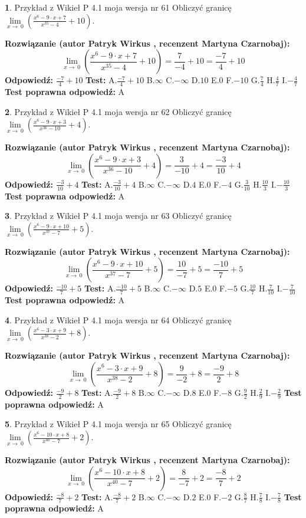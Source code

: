 \documentclass[12pt, a4paper]{article}
\theoremstyle{definition} %
\newtheorem{zad}{}
\newcommand{\zadStart}[1]{\begin{zad}#1\newline}
\newcommand{\zadStop}{\end{zad}}
\newcommand{\rozwStart}[2]{\noindent \textbf{Rozwiązanie (autor #1 , recenzent #2): }\newline}
\newcommand{\rozwStop}{\newline}
\newcommand{\odpStart}{\noindent \textbf{Odpowiedź:}\newline}
\newcommand{\odpStop}{\newline}
\newcommand{\testStart}{\noindent \textbf{Test:}\newline}
\newcommand{\testStop}{\newline}
\newcommand{\kluczStart}{\noindent \textbf{Test poprawna odpowiedź:}\newline}
\newcommand{\kluczStop}{\newline}
\begin{document}
\zadStart{Przykład z Wikieł P 4.1 moja wersja nr 61}
Obliczyć granicę $\lim\limits_{x\to\ 0}(\frac{x^{6}-9 \cdot x +7}{x^{35}-4}+10)$.
\zadStop
\rozwStart{Patryk Wirkus}{Martyna Czarnobaj}
$$\lim\limits_{x\to\ 0}(\frac{x^{6}-9 \cdot x +7}{x^{35}-4}+10)=\frac{7}{-4}+10=\frac{-7}{4}+10$$
\rozwStop
\odpStart
$\frac{-7}{4}+10$
\odpStop
\testStart
A.$\frac{-7}{4}+10$
B.$\infty$
C.$-\infty$
D.$10$
E.$0$
F.$-10$
G.$\frac{7}{4}$
H.$\frac{4}{7}$
I.$-\frac{4}{7}$
\testStop
\kluczStart
A
\kluczStop



\zadStart{Przykład z Wikieł P 4.1 moja wersja nr 62}
Obliczyć granicę $\lim\limits_{x\to\ 0}(\frac{x^{6}-9 \cdot x +3}{x^{36}-10}+4)$.
\zadStop
\rozwStart{Patryk Wirkus}{Martyna Czarnobaj}
$$\lim\limits_{x\to\ 0}(\frac{x^{6}-9 \cdot x +3}{x^{36}-10}+4)=\frac{3}{-10}+4=\frac{-3}{10}+4$$
\rozwStop
\odpStart
$\frac{-3}{10}+4$
\odpStop
\testStart
A.$\frac{-3}{10}+4$
B.$\infty$
C.$-\infty$
D.$4$
E.$0$
F.$-4$
G.$\frac{3}{10}$
H.$\frac{10}{3}$
I.$-\frac{10}{3}$
\testStop
\kluczStart
A
\kluczStop



\zadStart{Przykład z Wikieł P 4.1 moja wersja nr 63}
Obliczyć granicę $\lim\limits_{x\to\ 0}(\frac{x^{6}-9 \cdot x +10}{x^{37}-7}+5)$.
\zadStop
\rozwStart{Patryk Wirkus}{Martyna Czarnobaj}
$$\lim\limits_{x\to\ 0}(\frac{x^{6}-9 \cdot x +10}{x^{37}-7}+5)=\frac{10}{-7}+5=\frac{-10}{7}+5$$
\rozwStop
\odpStart
$\frac{-10}{7}+5$
\odpStop
\testStart
A.$\frac{-10}{7}+5$
B.$\infty$
C.$-\infty$
D.$5$
E.$0$
F.$-5$
G.$\frac{10}{7}$
H.$\frac{7}{10}$
I.$-\frac{7}{10}$
\testStop
\kluczStart
A
\kluczStop



\zadStart{Przykład z Wikieł P 4.1 moja wersja nr 64}
Obliczyć granicę $\lim\limits_{x\to\ 0}(\frac{x^{6}-3 \cdot x +9}{x^{38}-2}+8)$.
\zadStop
\rozwStart{Patryk Wirkus}{Martyna Czarnobaj}
$$\lim\limits_{x\to\ 0}(\frac{x^{6}-3 \cdot x +9}{x^{38}-2}+8)=\frac{9}{-2}+8=\frac{-9}{2}+8$$
\rozwStop
\odpStart
$\frac{-9}{2}+8$
\odpStop
\testStart
A.$\frac{-9}{2}+8$
B.$\infty$
C.$-\infty$
D.$8$
E.$0$
F.$-8$
G.$\frac{9}{2}$
H.$\frac{2}{9}$
I.$-\frac{2}{9}$
\testStop
\kluczStart
A
\kluczStop



\zadStart{Przykład z Wikieł P 4.1 moja wersja nr 65}
Obliczyć granicę $\lim\limits_{x\to\ 0}(\frac{x^{6}-10 \cdot x +8}{x^{40}-7}+2)$.
\zadStop
\rozwStart{Patryk Wirkus}{Martyna Czarnobaj}
$$\lim\limits_{x\to\ 0}(\frac{x^{6}-10 \cdot x +8}{x^{40}-7}+2)=\frac{8}{-7}+2=\frac{-8}{7}+2$$
\rozwStop
\odpStart
$\frac{-8}{7}+2$
\odpStop
\testStart
A.$\frac{-8}{7}+2$
B.$\infty$
C.$-\infty$
D.$2$
E.$0$
F.$-2$
G.$\frac{8}{7}$
H.$\frac{7}{8}$
I.$-\frac{7}{8}$
\testStop
\kluczStart
A
\kluczStop
\end{document}
